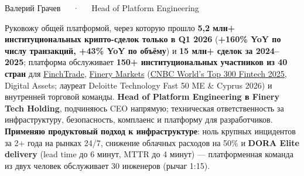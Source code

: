 \documentclass[10pt, a4paper]{awesome-cv}
\begin{document}
\makecvheader[C]

\makecvfooter
  {}
  {Валерий Грачев~~~·~~~Head of Platform Engineering}
  {\thepage}


\begin{cvparagraph}
Руковожу общей платформой, через которую прошло \textbf{5,2 млн+ институциональных крипто-сделок только в Q1 2026} (\textbf{+160\% YoY по числу транзакций, +43\% YoY по объёму}) и \textbf{15 млн+ сделок за 2024--2025}; платформа обслуживает \textbf{150+ институциональных участников из 40 стран} для \href{https://finchtrade.com}{FinchTrade}, \href{https://finerymarkets.com}{Finery Markets} (\href{https://www.cnbc.com/2025/06/19/the-worlds-top-fintech-companies-2025.html}{CNBC World's Top 300 Fintech 2025}, Digital Assets; лауреат Deloitte Technology Fast 50 ME \& Cyprus 2026) и внутренней торговой команды. \textbf{Head of Platform Engineering в Finery Tech Holding}, подчиняюсь CEO напрямую; техническая ответственность за инфраструктуру, безопасность, комплаенс и платформу для разработчиков. \textbf{Применяю продуктовый подход к инфраструктуре}: ноль крупных инцидентов за 2+ года на рынках 24/7, снижение облачных расходов на 50\% и \textbf{DORA Elite delivery} (lead time до 6 минут, MTTR до 4 минут) --- платформенная команда из двух человек обслуживает 30 инженеров (рычаг 1:15).
\end{cvparagraph}

\end{document}
